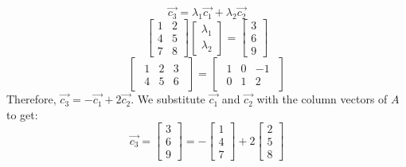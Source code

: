 \documentclass[oneside]{book}
\begin{document}
{    \[
        \vec{c_3} = \lambda_1 \vec{c_1} + \lambda_2 \vec{c_2}
    \]
    \[
        \begin{bmatrix}
            1 & 2\\
            4 & 5\\
            7 & 8
        \end{bmatrix}
        \begin{bmatrix}
            \lambda_1\\ \lambda_2
        \end{bmatrix}
        =
        \begin{bmatrix}
            3\\6\\9
        \end{bmatrix}
    \]
    \[
        \begin{bmatrix}
            \begin{array}{cc|c}
                1 & 2 & 3\\
                4 & 5 & 6
            \end{array}
        \end{bmatrix}
        =
        \begin{bmatrix}
            \begin{array}{cc|c}
                1 & 0 & -1\\
                0 & 1 & 2
            \end{array}
        \end{bmatrix}
    \]
    Therefore, $\vec{c_3} = -\vec{c_1} + 2\vec{c_2}$. We substitute $\vec{c_1}$ and $\vec{c_2}$ with the column vectors of $A$ to get:
    \[
        \boxed{\vec{c_3} = \begin{bmatrix}
            3\\6\\9
        \end{bmatrix}
        =
        - \begin{bmatrix}
            1\\4\\7
        \end{bmatrix}
        +
        2 \begin{bmatrix}
            2\\5\\8
        \end{bmatrix}  }
    \]


}


\end{document}
